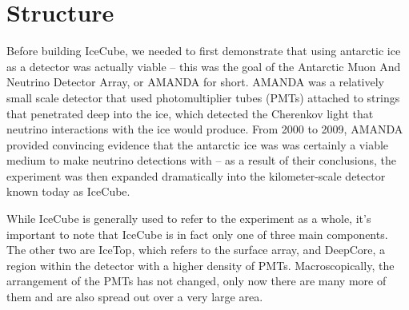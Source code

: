 \documentclass[11pt]{article}
\begin{document}
    \section{Structure}
    Before building IceCube, we needed to first demonstrate that using antarctic
    ice as a detector was actually viable -- this was the goal of the Antarctic Muon And
    Neutrino Detector Array, or AMANDA for short. AMANDA was a relatively small scale
    detector that used photomultiplier tubes (PMTs) attached to strings that penetrated deep
    into the ice, which detected the Cherenkov light that neutrino interactions with
    the ice would produce. From 2000 to 2009, AMANDA provided convincing evidence that 
    the antarctic ice was was certainly a viable medium to make neutrino detections with 
    -- as a result of their conclusions, the experiment was then expanded dramatically 
    into the kilometer-scale detector known today as IceCube. 

    While IceCube is generally used to refer to the experiment as a whole, it's important 
    to note that IceCube is in fact only one of three main components. The other two are 
    IceTop, which refers to the surface array, and DeepCore, a region within the detector
    with a higher density of PMTs. Macroscopically, the arrangement of the PMTs has not 
    changed, only now there are many more of them and are also spread out over a 
    very large area. 
\end{document}
